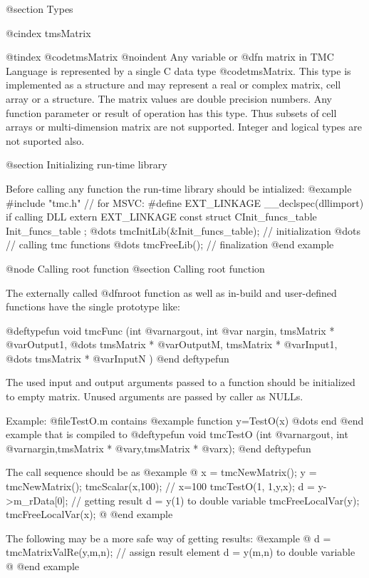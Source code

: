 @section  Types

@cindex tmsMatrix


@tindex @code{tmsMatrix}
@noindent
Any  variable or @dfn{ matrix } in TMC Language is represented by a single C data type 
@code{tmsMatrix}. This type is implemented as a structure and may represent a real or complex matrix, cell array or a structure. 
The matrix values are double precision numbers. Any function parameter or result of operation has this type. Thus subsets of cell arrays or multi-dimension matrix are not supported. Integer and logical types are not suported also.

@section Initializing run-time library

Before calling any function the run-time library should be intialized:
@example
#include "tmc.h"
// for MSVC: #define EXT_LINKAGE __declspec(dllimport) if calling DLL
extern EXT_LINKAGE const struct CInit_funcs_table Init_funcs_table ; 
@dots{}
tmcInitLib(&Init_funcs_table); // initialization
@dots{}
// calling tmc functions
@dots{}
tmcFreeLib(); // finalization
@end example




@node Calling root function
@section Calling root function

The externally called @dfn{root function}  as well as in-build and user-defined functions have the single prototype like:

@deftypefun void tmcFunc (int @var{nargout}, int  @var{ nargin}, tmsMatrix *  @var{Output1}, @dots{}  tmsMatrix *  @var{OutputM}, tmsMatrix *  @var{Input1}, @dots{}  tmsMatrix *  @var{InputN} )
@end  deftypefun

The used input and output arguments passed to a function should be initialized to empty matrix. 
Unused arguments are passed by caller as NULLs. 

Example:  @file{TestO.m} contains
@example
	function y=TestO(x)
	@dots{}
	end
@end example
that is compiled to 
@deftypefun  void tmcTestO (int  @var{nargout}, int  @var{nargin},tmsMatrix * @var{y},tmsMatrix * @var{x});
@end  deftypefun

The call sequence should be as
@example
@{
x = tmcNewMatrix();
y = tmcNewMatrix();
tmcScalar(x,100); // x=100
tmcTestO(1, 1,y,x);
d = y->m_rData[0]; // getting result d = y(1) to double variable
tmcFreeLocalVar(y);
tmcFreeLocalVar(x);
@}
@end example

The following may be a more safe way of getting results: 
@example
@{
 d = tmcMatrixValRe(y,m,n); // assign result element d = y(m,n) to double variable
@}
@end example


